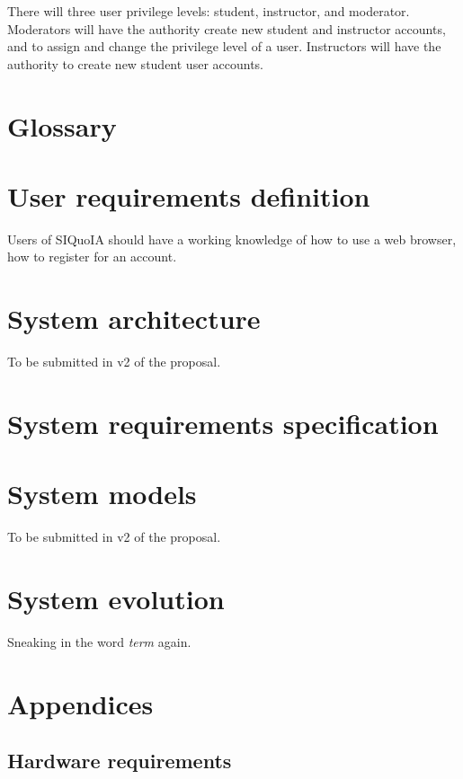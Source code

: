 \documentclass[12pt]{article}
\begin{document}
There will three user privilege levels: student, instructor, and
moderator. Moderators will have the authority create new student and
instructor accounts, and to assign and change the privilege level of a
user. Instructors will have the authority to create new student user
accounts.

\section{Glossary}
\printglossaries

\section{User requirements definition}
Users of SIQuoIA should have a working knowledge of how to use a web
browser, how to register for an account.

\section{System architecture}
To be submitted in v2 of the proposal.

\section{System requirements specification}

\section{System models}
To be submitted in v2 of the proposal.

\section{System evolution}
Sneaking in the word {\it \gls{term}} again.

\section{Appendices}

\subsection{Hardware requirements}

\printindex




\end{document}
